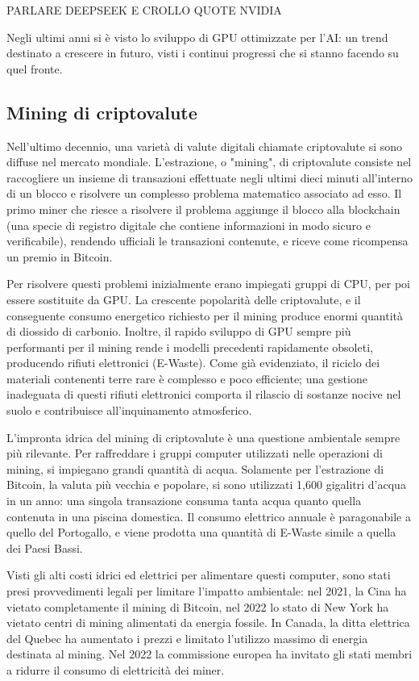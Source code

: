\documentclass[12pt,a4paper,oneside]{book}
\begin{document}
PARLARE DEEPSEEK E CROLLO QUOTE NVIDIA

Negli ultimi anni si è visto lo sviluppo di GPU ottimizzate per l'AI: un trend destinato a crescere in futuro, visti i continui progressi che si stanno facendo su quel fronte.

\subsection{Mining di criptovalute}

Nell'ultimo decennio, una varietà di valute digitali chiamate criptovalute si sono diffuse nel mercato mondiale. L'estrazione, o "mining", di criptovalute consiste nel raccogliere un insieme di transazioni effettuate negli ultimi dieci minuti all'interno di un blocco e risolvere un complesso problema matematico associato ad esso. Il primo miner che riesce a risolvere il problema aggiunge il blocco alla blockchain (una specie di registro digitale che contiene informazioni in modo sicuro e verificabile), rendendo ufficiali le transazioni contenute, e riceve come ricompensa un premio in Bitcoin.

Per risolvere questi problemi inizialmente erano impiegati gruppi di CPU, per poi essere sostituite da GPU. La crescente popolarità delle criptovalute, e il conseguente consumo energetico richiesto per il mining produce enormi quantità di diossido di carbonio. Inoltre, il rapido sviluppo di GPU sempre più performanti per il mining rende i modelli precedenti rapidamente obsoleti, producendo rifiuti elettronici (E-Waste). Come già evidenziato, il riciclo dei materiali contenenti terre rare è complesso e poco efficiente; una gestione inadeguata di questi rifiuti elettronici comporta il rilascio di sostanze nocive nel suolo e contribuisce all'inquinamento atmosferico.

L'impronta idrica del mining di criptovalute è una questione ambientale sempre più rilevante. Per raffreddare i gruppi computer utilizzati nelle operazioni di mining, si impiegano grandi quantità di acqua. Solamente per l'estrazione di Bitcoin, la valuta più vecchia e popolare, si sono utilizzati 1,600 gigalitri d'acqua in un anno: una singola transazione consuma tanta acqua quanto quella contenuta in una piscina domestica. Il consumo elettrico annuale è paragonabile a quello del Portogallo, e viene prodotta una quantità di E-Waste simile a quella dei Paesi Bassi.

Visti gli alti costi idrici ed elettrici per alimentare questi computer, sono stati presi provvedimenti legali per limitare l'impatto ambientale: nel 2021, la Cina ha vietato completamente il mining di Bitcoin, nel 2022 lo stato di New York ha vietato centri di mining alimentati da energia fossile. In Canada, la ditta elettrica del Quebec ha aumentato i prezzi e limitato l'utilizzo massimo di energia destinata al mining. Nel 2022 la commissione europea ha invitato gli stati membri a ridurre il consumo di elettricità dei miner.
\end{document}

